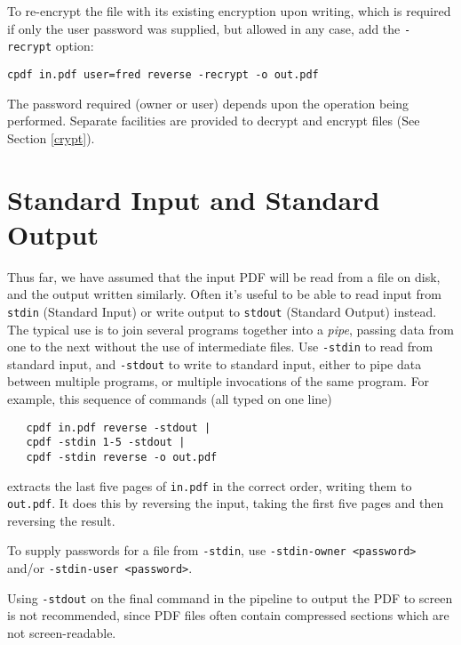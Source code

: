 \documentclass{book}
\begin{document}
\noindent To re-encrypt the file with its existing encryption upon writing, which is required if only the user password was supplied, but allowed in any case, add the \texttt{-recrypt} option:

\begin{framed}
\small\verb!cpdf in.pdf user=fred reverse -recrypt -o out.pdf!
\end{framed}

\noindent The password required (owner or user) depends upon the operation
being performed. Separate facilities are provided to decrypt and encrypt files
(See Section \ref{crypt}).

  \section{Standard Input and Standard Output}
 
  Thus far, we have assumed that the input PDF will be read from a file on
disk, and the output written similarly. Often it's useful to be able to read
input from \texttt{stdin} (Standard Input) or write output to \texttt{stdout}
(Standard Output) instead. The typical use is to join several programs
together into a \textit{pipe}, passing data from one to the next without the
use of intermediate files. Use \texttt{-stdin} to read from standard input, and
\texttt{-stdout} to write to standard input, either to pipe data between
multiple programs, or multiple invocations of the same program. For example, this sequence of commands (all typed on one line)

  \begin{framed}
  \small\begin{verbatim}   cpdf in.pdf reverse -stdout |
   cpdf -stdin 1-5 -stdout |
   cpdf -stdin reverse -o out.pdf\end{verbatim}
  \end{framed}

\noindent extracts the last five pages of \texttt{in.pdf} in the correct order,
writing them to \texttt{out.pdf}. It does this by reversing the input, taking
the first five pages and then reversing the result.

To supply passwords for a file from \texttt{-stdin}, use \texttt{-stdin-owner <password>} and/or \texttt{-stdin-user <password>}.

Using \texttt{-stdout} on the final command in the pipeline to output the PDF
to screen is not recommended, since PDF files often contain compressed sections
which are not screen-readable.
\end{document}
